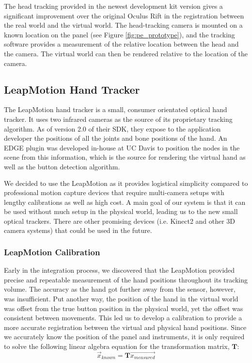 The head tracking provided in the newest development kit version gives a significant improvement over the original Oculus Rift in the registration between the real world and the virtual world.
The head-tracking camera is mounted on a known location on the panel (see Figure \ref{fig:pe_prototype}), and the tracking software provides a measurement of the relative location between the head and the camera.
The virtual world can then be rendered relative to the location of the camera.


\subsection{LeapMotion Hand Tracker}

The LeapMotion hand tracker is a small, consumer orientated optical hand tracker.
It uses two infrared cameras as the source of its proprietary tracking algorithm.
As of version 2.0 of their SDK, they expose to the application developer the positions of all the joints and bone positions of the hand.
An EDGE plugin was developed in-house at UC Davis to position the nodes in the scene from this information, which is the source for rendering the virtual hand as well as the button detection algorithm.

We decided to use the LeapMotion as it provides logistical simplicity compared to professional motion capture devices that require multi-camera setups with lengthy calibrations as well as high cost.
A main goal of our system is that it can be used without much setup in the physical world, leading us to the new small optical trackers.
There are other promising devices (i.e. Kinect2 and other 3D camera systems) that could be used in the future.

\subsubsection{LeapMotion Calibration}

Early in the integration process, we discovered that the LeapMotion provided precise and repeatable measurement of the hand positions throughout its tracking volume.
The accuracy as the hand got further away from the sensor, however, was insufficient.
Put another way, the position of the hand in the virtual world was offset from the true button position in the physical world, yet the offset was consistent between movements.
This led us to develop a calibration to provide a more accurate registration between the virtual and physical hand positions.
Since we accurately know the position of the panel and instruments, it is only required to solve the following linear algebra equation for the transformation matrix, $\mathbf{T}$:
\begin{equation}
    \vec{x}_{known} = \mathbf{T}\vec{x_{measured}}
    \label{eq:pe_Tvec}
\end{equation}


